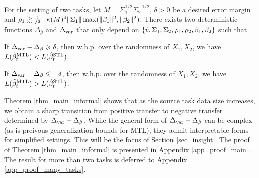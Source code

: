 \begin{theorem}\label{thm_main_informal}
	For the setting of two tasks, let $M=\Sigma_1^{1/2}\Sigma_2^{-1/2}$, $\delta > 0$ be a desired error margin and $\rho_1 \gtrsim \frac{1}{\delta^2}\cdot \kappa(M)^4 \|\Sigma_1\| \max(\|\beta_1\|^2, \|\beta_2\|^2)$.
	There exists two deterministic functions $\Delta_{\beta}$ and $\Delta_{\text{var}}$ that only depend on $\{\hat{v}, \Sigma_1, \Sigma_2, \rho_1, \rho_2, \beta_1, \beta_2\}$ such that
	\squishlist
		\item If $\Delta_{\text{var}} - \Delta_{\beta} \geqslant \delta$, then w.h.p. over the randomness of $X_1, X_2$, we have $L(\hat{\beta}_t^{\text{MTL}}) < L(\hat{\beta}_t^{\text{STL}})$.
		\item If $\Delta_{\text{var}} - \Delta_{\beta} \leqslant -\delta$, then w.h.p. over the randomness of $X_1, X_2$, we have $L(\hat{\beta}_t^{\text{MTL}}) > L(\hat{\beta}_t^{\text{STL}})$.
	\squishend
\end{theorem}

Theorem \ref{thm_main_informal} shows that as the source task data size increases, we obtain a sharp transition from positive transfer to negative transfer determined by $\Delta_{\text{var}} - \Delta_{\beta}$.
While the general form of $\Delta_{\text{var}}-\Delta_{\beta}$ can be complex (as is preivous generalization bounds for MTL), they admit interpretable forms for simplified settings.
This will be the focus of Section \ref{sec_insight}.
The proof of Theorem \ref{thm_main_informal} is presented in Appendix \ref{app_proof_main}.
The result for more than two tasks is deferred to Appendix \ref{app_proof_many_tasks}.

